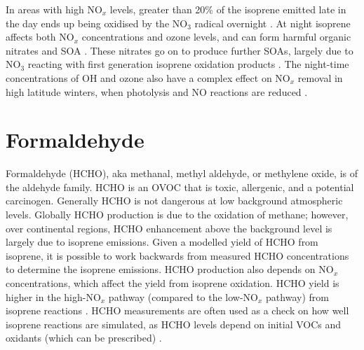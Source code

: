       In areas with high NO$_x$ levels, greater than 20\% of the isoprene emitted late in the day ends up being oxidised by the NO$_3$ radical overnight \parencite{Brown2009}.
      At night isoprene affects both NO$_x$ concentrations and ozone levels, and can form harmful organic nitrates and SOA \parencite{Brown2009, Mao2013}.
      These nitrates go on to produce further SOAs, largely due to NO$_3$ reacting with first generation isoprene oxidation products \parencite{Rollins2009}.
      The night-time concentrations of OH and ozone also have a complex effect on NO$_x$ removal in high latitude winters, when photolysis and NO reactions are reduced \parencite{Ayers2006}.
      
    
\section{Formaldehyde}
\label{LR:HCHO}

  Formaldehyde (HCHO), aka methanal, methyl aldehyde, or methylene oxide, is of the aldehyde family.
  HCHO is an OVOC that is toxic, allergenic, and a potential carcinogen.
  Generally HCHO is not dangerous at low background atmospheric levels.
  Globally HCHO production is due to the oxidation of methane; however, over continental regions, HCHO enhancement above the background level is largely due to isoprene emissions.
  Given a modelled yield of HCHO from isoprene, it is possible to work backwards from measured HCHO concentrations to determine the isoprene emissions.
  HCHO production also depends on NO$_x$ concentrations, which affect the yield from isoprene oxidation.
  HCHO yield is higher in the high-NO$_x$ pathway (compared to the low-NO$_x$ pathway) from isoprene reactions \parencite{Marais2012}.
  HCHO measurements are often used as a check on how well isoprene reactions are simulated, as HCHO levels depend on initial VOCs and oxidants (which can be prescribed) \parencite{Marvin2017}.
  
  

